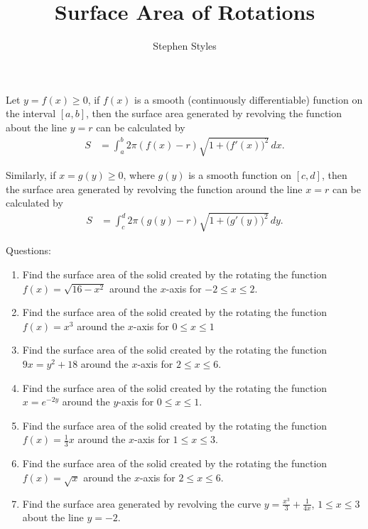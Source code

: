\documentclass[16pt]{article}
\title{Surface Area of Rotations}
\author{Stephen Styles}
\theoremstyle{remark}
\begin{document}
\maketitle

Let $y = f(x) \geq 0$, if $f(x)$ is a smooth (continuously differentiable) function on the interval ${[a,b]}$, then the surface area generated by revolving the function about the line $y=r$ can be calculated by
\begin{align*}
S &= \int_a^b 2\pi (f(x)-r) \sqrt{1+ \big( f'(x) \big)^2} \, dx.
\end{align*}

Similarly, if $x = g(y) \geq 0$, where $g(y)$ is a smooth function on ${[c,d]}$, then the surface area generated by revolving the function around the line $x=r$ can be calculated by
\begin{align*}
S &= \int_c^d 2\pi (g(y)-r) \sqrt{1+\big( g'(y) \big)^2} \, dy.
\end{align*}

Questions:
\begin{enumerate}
\item Find the surface area of the solid created by the rotating the function $f(x) = \sqrt{16-x^2}$ around the $x$-axis for $-2 \leq x \leq 2$.
\newpage
\item Find the surface area of the solid created by the rotating the function $f(x) = x^3$ around the $x$-axis for $0 \leq x \leq 1$
\newpage
\item Find the surface area of the solid created by the rotating the function $9x = y^2+18$ around the $x$-axis for $2 \leq x \leq 6$.
\newpage
\item Find the surface area of the solid created by the rotating the function $x = e^{-2y}$ around the $y$-axis for $0 \leq x \leq 1$.
\newpage
\item Find the surface area of the solid created by the rotating the function $f(x) = \frac{1}{3}x$ around the $x$-axis for $1 \leq x \leq 3$.
\newpage
\item Find the surface area of the solid created by the rotating the function $f(x) = \sqrt{x}$ around the $x$-axis for $2 \leq x \leq 6$.
\newpage
\item Find the surface area generated by revolving the curve $y=\frac{x^3}{3}+\frac{1}{4x}$, $1\leq x \leq 3$ about the line $y=-2$.
\newpage
\end{enumerate}
\end{document}
